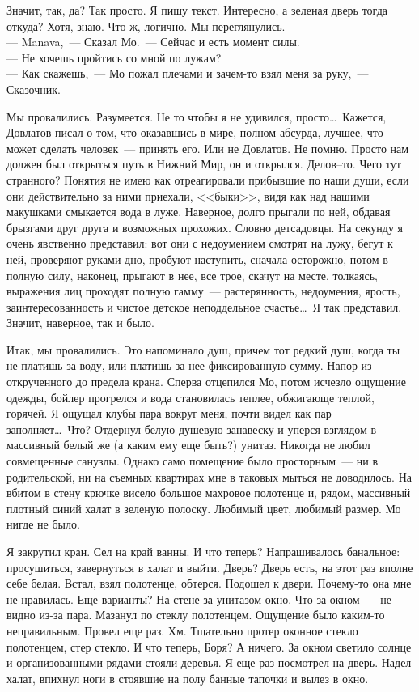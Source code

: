 Значит, так, да? Так просто. Я пишу текст. Интересно, а зеленая дверь тогда 
откуда? Хотя, знаю. Что ж, логично. Мы переглянулись.\\
--- Manava,~--- Сказал Мо.~--- Сейчас и есть момент силы.\\
--- Не хочешь пройтись со мной по лужам?\\
--- Как скажешь,~--- Мо пожал плечами и зачем-то взял меня за руку,~--- Сказочник.


Мы провалились. Разумеется. Не то чтобы я не удивился, просто\ldots\ Кажется, 
Довлатов писал о том, что оказавшись в мире, полном абсурда, лучшее, что может 
сделать человек~--- принять его. Или не Довлатов. Не помню. Просто нам должен 
был открыться путь в Нижний Мир, он и открылся. Делов--то. Чего тут странного? 
Понятия не имею как отреагировали прибывшие по наши души, если они 
действительно за ними приехали, <<быки>>, видя как над нашими макушками смыкается вода в 
луже. Наверное, долго прыгали по ней, обдавая брызгами друг друга и возможных 
прохожих. Словно детсадовцы. На секунду я очень явственно представил: вот они с 
недоумением смотрят на лужу, бегут к ней, проверяют руками дно, пробуют 
наступить, сначала осторожно, потом в полную силу, наконец, прыгают в нее, все 
трое, скачут на месте, толкаясь, выражения лиц проходят полную гамму~--- 
растерянность, недоумения, ярость, заинтересованность и чистое детское 
неподдельное счастье\ldots\ Я так представил. Значит, наверное, так и было.


Итак, мы провалились. Это напоминало душ, причем тот редкий душ, когда ты не 
платишь за воду, или платишь за нее фиксированную сумму. Напор из открученного 
до предела крана. Сперва отцепился Мо, потом исчезло ощущение одежды, бойлер 
прогрелся и вода становилась теплее, обжигающе теплой, горячей. Я ощущал клубы 
пара вокруг меня, почти видел как пар заполняет\ldots\ Что? Отдернул белую 
душевую занавеску и уперся взглядом в массивный белый же (а каким ему еще быть?) 
унитаз. Никогда не любил совмещенные санузлы. Однако само помещение было просторным~--- 
ни в родительской, ни на съемных квартирах мне в таковых мыться не доводилось. На 
вбитом в стену крючке висело большое махровое полотенце и, рядом, массивный 
плотный синий халат в зеленую полоску. Любимый цвет, любимый размер. Мо нигде 
не было.

Я закрутил кран. Сел на край ванны. И что теперь? Напрашивалось банальное: 
просушиться, завернуться в халат и выйти. Дверь? Дверь есть, на этот раз вполне 
себе белая. Встал, взял полотенце, обтерся. Подошел к двери. Почему-то она мне 
не нравилась. Еще варианты? На стене за унитазом окно. Что за окном~--- не 
видно из-за пара. Мазанул по стеклу полотенцем. Ощущение было каким-то неправильным. 
Провел еще раз. Хм. Тщательно протер оконное стекло полотенцем, стер стекло. И 
что теперь, Боря? А ничего. За окном светило солнце и организованными рядами 
стояли деревья. Я еще раз посмотрел на дверь. Надел халат, впихнул ноги в 
стоявшие на полу банные тапочки и вылез в окно.

